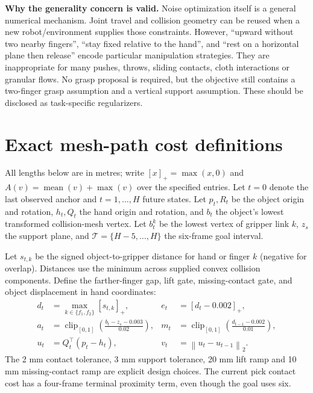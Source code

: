 \documentclass[10pt]{article}
\newcommand{\norm}[1]{\left\lVert#1\right\rVert}
\newcommand{\mean}{\operatorname{mean}}
\newcommand{\clip}{\operatorname{clip}_{[0,1]}}
\begin{document}
\textbf{Why the generality concern is valid.} Noise optimization itself is a
general numerical mechanism. Joint travel and collision geometry can be
reused when a new robot/environment supplies those constraints. However,
``upward without two nearby fingers'', ``stay fixed relative to the hand'',
and ``rest on a horizontal plane then release'' encode particular manipulation
strategies. They are inappropriate for many pushes, throws, sliding contacts,
cloth interactions or granular flows. No grasp proposal is required, but the
objective still contains a two-finger grasp assumption and a vertical support
assumption. These should be disclosed as task-specific regularizers.

\clearpage
\appendix
\section{Exact mesh-path cost definitions}
All lengths below are in metres; write $[x]_+=\max(x,0)$ and
$A(v)=\mean(v)+\max(v)$ over the specified entries. Let $t=0$ denote the last
observed anchor and $t=1,\ldots,H$ future states. Let $p_t,R_t$ be the object
origin and rotation, $h_t,Q_t$ the hand origin and rotation, and $b_t$ the
object's lowest transformed collision-mesh vertex. Let $b^k_t$ be the lowest
vertex of gripper link $k$, $z_s$ the support plane, and
$\mathcal T=\{H-5,\ldots,H\}$ the six-frame goal interval.

Let $s_{t,k}$ be the signed object-to-gripper distance for hand or finger $k$
(negative for overlap). Distances use the minimum across supplied convex
collision components. Define the farther-finger gap, lift gate, missing-contact
gate, and object displacement in hand coordinates:
\begin{align}
 d_t&=\max_{k\in\{f_1,f_2\}}[s_{t,k}]_+,
 &e_t&=[d_t-0.002]_+,\\
 a_t&=\clip\!\left(\frac{b_t-z_s-0.003}{0.02}\right),
 &m_t&=\clip\!\left(\frac{d_{t-1}-0.002}{0.01}\right),\\
 u_t&=Q_t^\top(p_t-h_t),
 &v_t&=\norm{u_t-u_{t-1}}_2.
\end{align}
The 2 mm contact tolerance, 3 mm support tolerance, 20 mm lift ramp and 10 mm
missing-contact ramp are explicit design choices. The current pick contact
cost has a four-frame terminal proximity term, even though the goal uses six.
\end{document}
